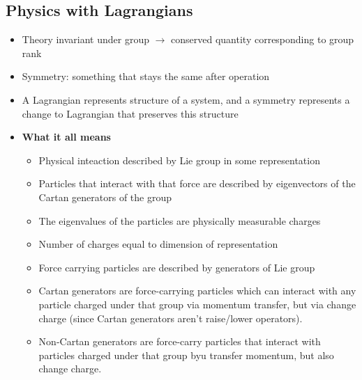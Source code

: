 \subsection{Physics with Lagrangians}
\begin{itemize}
    \item Theory invariant under group $\to$ conserved quantity corresponding to group rank \cite{hokim}
    \item Symmetry: something that stays the same after operation \cite{robinson}
    \item A Lagrangian represents structure of a system, and a symmetry represents a change to Lagrangian that preserves this structure \cite{robinson}
    \item \textbf{What it all means} \cite{robinson}
    \begin{itemize}
        \item Physical inteaction described by Lie group in some representation \cite{robinson}
        \item Particles that interact with that force are described by eigenvectors of the Cartan generators of the group \cite{robinson}
        \item The eigenvalues of the particles are physically measurable charges \cite{robinson}
        \item Number of charges equal to dimension of representation \cite{robinson}
        \item Force carrying particles are described by generators of Lie group \cite{robinson}
        \item Cartan generators are force-carrying particles which can interact with any particle charged under that group via momentum transfer, but via change charge (since Cartan generators aren't raise/lower operators). \cite{robinson}
        \item Non-Cartan generators are force-carry particles that interact with particles charged under that group byu transfer momentum, but also change charge. \cite{robinson}
    \end{itemize}
\end{itemize}

